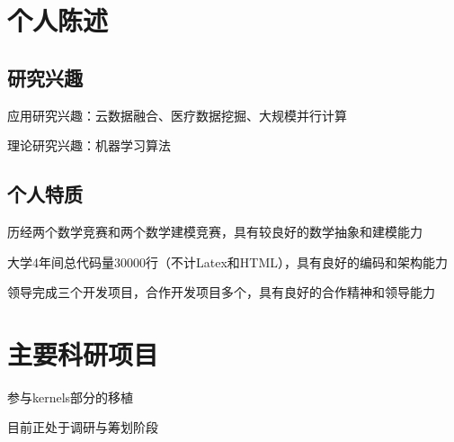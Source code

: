 \documentclass[]{deedy-resume-openfont}
\begin{document}
\hfill
\begin{minipage}[t]{0.73\textwidth}
    \section{个人陈述}
    \subsection{研究兴趣}
    \vspace{\topsep}
	\begin{tightemize}
		\item 应用研究兴趣：云数据融合、医疗数据挖掘、大规模并行计算
		\item 理论研究兴趣：机器学习算法
	\end{tightemize}
    \subsection{个人特质}
    \vspace{\topsep}
    \begin{tightemize}
        \item 历经两个数学竞赛和两个数学建模竞赛，具有较良好的数学抽象和建模能力
		\item 大学4年间总代码量30000行（不计Latex和HTML），具有良好的编码和架构能力
		\item 领导完成三个开发项目，合作开发项目多个，具有良好的合作精神和领导能力
	\end{tightemize}
    \sectionsep

	

	\section{主要科研项目}
	\descript{}
	\begin{tightemize}
		\item 参与kernels部分的移植
		\item 目前正处于调研与筹划阶段
	\end{tightemize}
    \sectionsep


\end{minipage}
\end{document}
